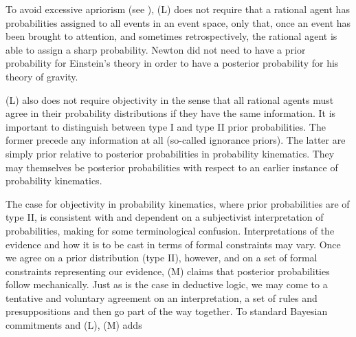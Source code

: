 \documentclass[11pt]{article}
\begin{document}

To avoid excessive apriorism (see ), (L)
does not require that a rational agent has probabilities assigned to
all events in an event space, only that, once an event has been
brought to attention, and sometimes retrospectively, the rational
agent is able to assign a sharp probability. Newton did not need to
have a prior probability for Einstein's theory in order to have a
posterior probability for his theory of gravity.

(L) also does not require objectivity in the sense that all rational
agents must agree in their probability distributions if they have the
same information. It is important to distinguish between type I and
type II prior probabilities. The former precede any information at all
(so-called ignorance priors). The latter are simply prior relative to
posterior probabilities in probability kinematics. They may themselves
be posterior probabilities with respect to an earlier instance of
probability kinematics. 

The case for objectivity in probability kinematics, where prior
probabilities are of type II, is consistent with and dependent on a
subjectivist interpretation of probabilities, making for some
terminological confusion. Interpretations of the evidence and how it
is to be cast in terms of formal constraints may vary. Once we agree
on a prior distribution (type II), however, and on a set of formal
constraints representing our evidence, (M) claims that posterior
probabilities follow mechanically. Just as is the case in deductive
logic, we may come to a tentative and voluntary agreement on an
interpretation, a set of rules and presuppositions and then go part of
the way together. To standard Bayesian commitments and (L), (M) adds
\end{document}
